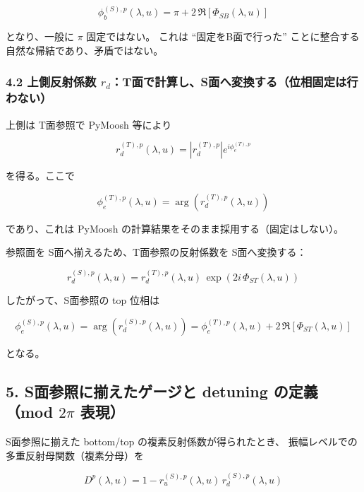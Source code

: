 \begin{equation}
\boxed{
\phi_b^{(S),p}(\lambda,u)
=
\pi + 2\,\Re\!\left[\Phi_{SB}(\lambda,u)\right]
}
\end{equation}

となり、一般に \(\pi\) 固定ではない。
これは ``固定をB面で行った'' ことに整合する自然な帰結であり、矛盾ではない。

\subsubsection*{4.2 上側反射係数 \(r_d\)：T面で計算し、S面へ変換する（位相固定は行わない）}

上側は T面参照で PyMoosh 等により

\begin{equation}
r_d^{(T),p}(\lambda,u)=\left|r_d^{(T),p}\right|e^{i\phi_e^{(T),p}}
\end{equation}

を得る。ここで

\begin{equation}
\boxed{
\phi_e^{(T),p}(\lambda,u)=\arg\left(r_d^{(T),p}(\lambda,u)\right)
}
\end{equation}

であり、これは PyMoosh の計算結果をそのまま採用する（固定はしない）。

参照面を S面へ揃えるため、T面参照の反射係数を S面へ変換する：

\begin{equation}
\boxed{
r_d^{(S),p}(\lambda,u)
=
r_d^{(T),p}(\lambda,u)\,
\exp\!\left(2i\,\Phi_{ST}(\lambda,u)\right)
}
\end{equation}

したがって、S面参照の top 位相は

\begin{equation}
\boxed{
\phi_e^{(S),p}(\lambda,u)
=
\arg\left(r_d^{(S),p}(\lambda,u)\right)
=
\phi_e^{(T),p}(\lambda,u)+2\,\Re\!\left[\Phi_{ST}(\lambda,u)\right]
}
\end{equation}

となる。

\subsection*{5. S面参照に揃えたゲージと detuning の定義（mod \(2\pi\) 表現）}

S面参照に揃えた bottom/top の複素反射係数が得られたとき、
振幅レベルでの多重反射母関数（複素分母）を

\begin{equation}
\boxed{
D^{p}(\lambda,u)
=
1
-
r_u^{(S),p}(\lambda,u)\,
r_d^{(S),p}(\lambda,u)
}
\end{equation}

